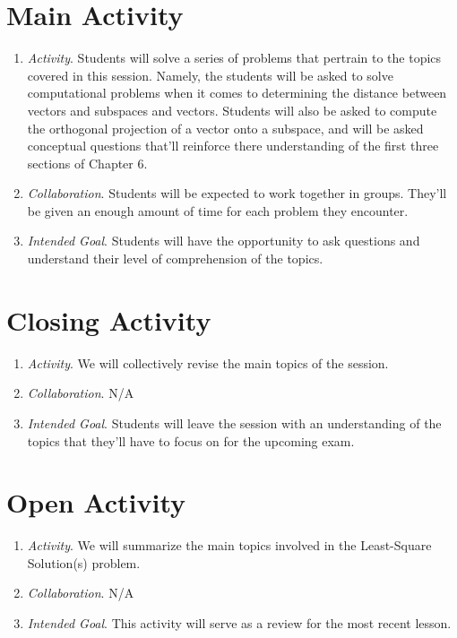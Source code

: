 \documentclass[11pt]{article}
\begin{document}
\section{\centering Main Activity}
	\begin{enumerate}
		\item \textit{Activity}. Students will solve a series of problems that pertrain to the topics covered in this session. Namely, the students will be asked
						to solve computational problems when it comes to determining the distance between vectors and subspaces and vectors.
						Students will also be asked to compute the orthogonal projection of a vector onto a subspace, and will be asked conceptual
						questions that'll reinforce there understanding of the first three sections of Chapter 6.
		\item \textit{Collaboration}. Students will be expected to work together in groups. They'll be given an enough amount of time for each problem they
							encounter.
		\item \textit{Intended Goal}. Students will have the opportunity to ask questions and understand their level of comprehension of the topics.
	\end{enumerate}

\section{\centering Closing Activity}
	\begin{enumerate}
		\item \textit{Activity}. We will collectively revise the main topics of the session.
		\item \textit{Collaboration}. \textsc{N/A}
		\item \textit{Intended Goal}. Students will leave the session with an understanding of the topics that they'll have to focus on for the upcoming exam.
	\end{enumerate}

\newpage
{}
\section{\centering Open Activity}
	\begin{enumerate}
		\item \textit{Activity}. We will summarize the main topics involved in the Least-Square Solution(s) problem.
		\item \textit{Collaboration}.  N/A
		\item \textit{Intended Goal}. This activity will serve as a review for the most recent lesson.
	\end{enumerate}
\end{document}
